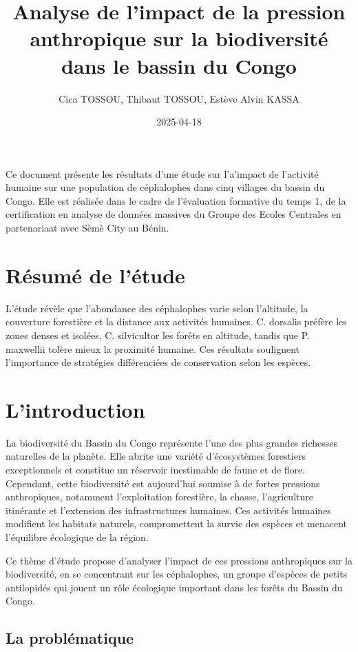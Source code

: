 \documentclass[
]{book}
\title{Analyse de l'impact de la pression anthropique sur la biodiversité dans le bassin du Congo}
\author{Cica TOSSOU, Thibaut TOSSOU, Estève Alvin KASSA}
\date{2025-04-18}
\begin{document}
\maketitle

{
\setcounter{tocdepth}{1}
\tableofcontents
}
\newpage

Ce document présente les résultats d'une étude sur l'a'impact de l'activité humaine sur une population de céphalophes dans cinq villages du bassin du Congo. Elle est réalisée dans le cadre de l'évaluation formative du temps 1, de la certification en analyse de données massives du Groupe des Ecoles Centrales en partenariaat avec Sèmè City au Bénin.

\newpage

\chapter{Résumé de l'étude}\label{ruxe9sumuxe9-de-luxe9tude}

L'étude révèle que l'abondance des céphalophes varie selon l'altitude, la couverture forestière et la distance aux activités humaines. C. dorsalis préfère les zones denses et isolées, C. silvicultor les forêts en altitude, tandis que P. maxwellii tolère mieux la proximité humaine. Ces résultats soulignent l'importance de stratégies différenciées de conservation selon les espèces.

\chapter{L'introduction}\label{lintroduction}

La biodiversité du Bassin du Congo représente l'une des plus grandes richesses naturelles de la planète. Elle abrite une variété d'écosystèmes forestiers exceptionnels et constitue un réservoir inestimable de faune et de flore. Cependant, cette biodiversité est aujourd'hui soumise à de fortes pressions anthropiques, notamment l'exploitation forestière, la chasse, l'agriculture itinérante et l'extension des infrastructures humaines. Ces activités humaines modifient les habitats naturels, compromettent la survie des espèces et menacent l'équilibre écologique de la région.

Ce thème d'étude propose d'analyser l'impact de ces pressions anthropiques sur la biodiversité, en se concentrant sur les céphalophes, un groupe d'espèces de petits antilopidés qui jouent un rôle écologique important dans les forêts du Bassin du Congo.

\section{La problématique}\label{la-probluxe9matique}
\end{document}
